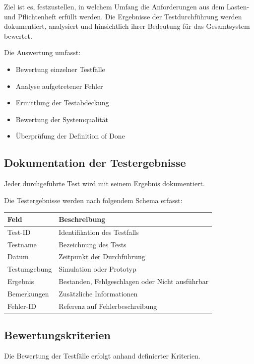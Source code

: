 Ziel ist es, festzustellen, in welchem Umfang die Anforderungen aus dem
Lasten- und Pflichtenheft erfüllt werden. Die Ergebnisse der
Testdurchführung werden dokumentiert, analysiert und hinsichtlich ihrer
Bedeutung für das Gesamtsystem bewertet.

Die Auswertung umfasst:

\begin{itemize}
\tightlist
\item
  Bewertung einzelner Testfälle
\item
  Analyse aufgetretener Fehler
\item
  Ermittlung der Testabdeckung
\item
  Bewertung der Systemqualität
\item
  Überprüfung der Definition of Done
\end{itemize}

\subsection{Dokumentation der
Testergebnisse}\label{dokumentation-der-testergebnisse}

Jeder durchgeführte Test wird mit seinem Ergebnis dokumentiert.

Die Testergebnisse werden nach folgendem Schema erfasst:

\begin{longtable}[]{@{}ll@{}}
\toprule\noalign{}
Feld & Beschreibung \\
\midrule\noalign{}
\endhead
\bottomrule\noalign{}
\endlastfoot
Test-ID & Identifikation des Testfalls \\
Testname & Bezeichnung des Tests \\
Datum & Zeitpunkt der Durchführung \\
Testumgebung & Simulation oder Prototyp \\
Ergebnis & Bestanden, Fehlgeschlagen oder Nicht ausführbar \\
Bemerkungen & Zusätzliche Informationen \\
Fehler-ID & Referenz auf Fehlerbeschreibung \\
\end{longtable}

\subsection{Bewertungskriterien}\label{bewertungskriterien}

Die Bewertung der Testfälle erfolgt anhand definierter Kriterien.


